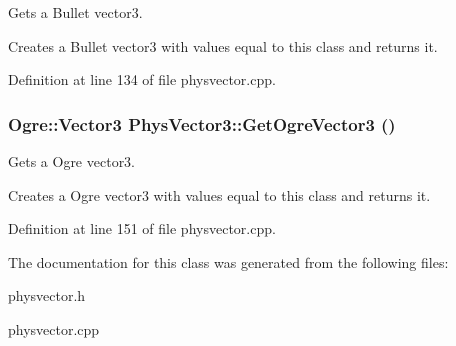 Gets a Bullet vector3. 

Creates a Bullet vector3 with values equal to this class and returns it. 

Definition at line 134 of file physvector.cpp.

\hypertarget{classPhysVector3_a01facc2b865bb79c589ed1985dd6c49c}{
\subsubsection[{GetOgreVector3}]{\setlength{\rightskip}{0pt plus 5cm}Ogre::Vector3 PhysVector3::GetOgreVector3 ()}}
\label{da/d11/classPhysVector3_a01facc2b865bb79c589ed1985dd6c49c}


Gets a Ogre vector3. 

Creates a Ogre vector3 with values equal to this class and returns it. 

Definition at line 151 of file physvector.cpp.



The documentation for this class was generated from the following files:\begin{DoxyCompactItemize}
\item 
physvector.h\item 
physvector.cpp\end{DoxyCompactItemize}
